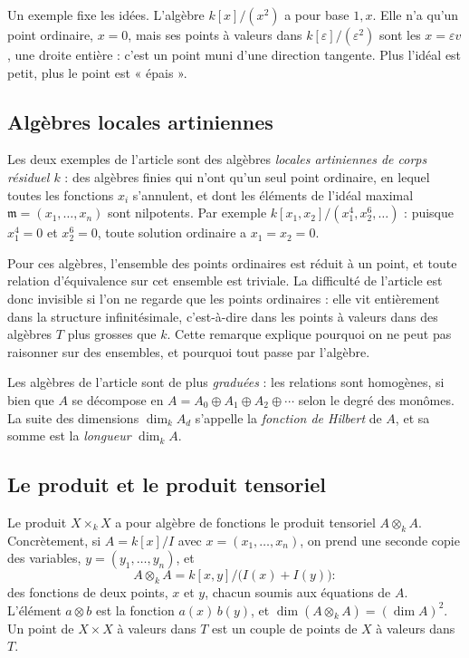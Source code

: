 \documentclass[11pt,a4paper]{amsart}
\theoremstyle{definition}
\theoremstyle{plain}
\theoremstyle{remark}
\begin{document}
Un exemple fixe les idées. L'algèbre $k[x]/(x^2)$ a pour base $1, x$. Elle n'a qu'un point ordinaire, $x = 0$, mais ses points à valeurs dans $k[\varepsilon]/(\varepsilon^2)$ sont les $x = \varepsilon v$, une droite entière : c'est un point muni d'une direction tangente. Plus l'idéal est petit, plus le point est « épais ».

\subsection{Algèbres locales artiniennes}

Les deux exemples de l'article sont des algèbres \emph{locales artiniennes de corps résiduel $k$} : des algèbres finies qui n'ont qu'un seul point ordinaire, en lequel toutes les fonctions $x_i$ s'annulent, et dont les éléments de l'idéal maximal $\mathfrak m = (x_1, \dots, x_n)$ sont nilpotents. Par exemple $k[x_1, x_2]/(x_1^4, x_2^6, \dots)$ : puisque $x_1^4 = 0$ et $x_2^6 = 0$, toute solution ordinaire a $x_1 = x_2 = 0$.

Pour ces algèbres, l'ensemble des points ordinaires est réduit à un point, et toute relation d'équivalence sur cet ensemble est triviale. La difficulté de l'article est donc invisible si l'on ne regarde que les points ordinaires : elle vit entièrement dans la structure infinitésimale, c'est-à-dire dans les points à valeurs dans des algèbres $T$ plus grosses que $k$. Cette remarque explique pourquoi on ne peut pas raisonner sur des ensembles, et pourquoi tout passe par l'algèbre.

Les algèbres de l'article sont de plus \emph{graduées} : les relations sont homogènes, si bien que $A$ se décompose en $A = A_0 \oplus A_1 \oplus A_2 \oplus \cdots$ selon le degré des monômes. La suite des dimensions $\dim_k A_d$ s'appelle la \emph{fonction de Hilbert} de $A$, et sa somme est la \emph{longueur} $\dim_k A$.

\subsection{Le produit et le produit tensoriel}

Le produit $X \times_k X$ a pour algèbre de fonctions le produit tensoriel $A \otimes_k A$. Concrètement, si $A = k[x]/I$ avec $x = (x_1, \dots, x_n)$, on prend une seconde copie des variables, $y = (y_1, \dots, y_n)$, et
\[
A \otimes_k A = k[x, y]/\bigl(I(x) + I(y)\bigr) :
\]
des fonctions de deux points, $x$ et $y$, chacun soumis aux équations de $A$. L'élément $a \otimes b$ est la fonction $a(x)\,b(y)$, et $\dim (A \otimes_k A) = (\dim A)^2$. Un point de $X \times X$ à valeurs dans $T$ est un couple de points de $X$ à valeurs dans $T$.
\end{document}
